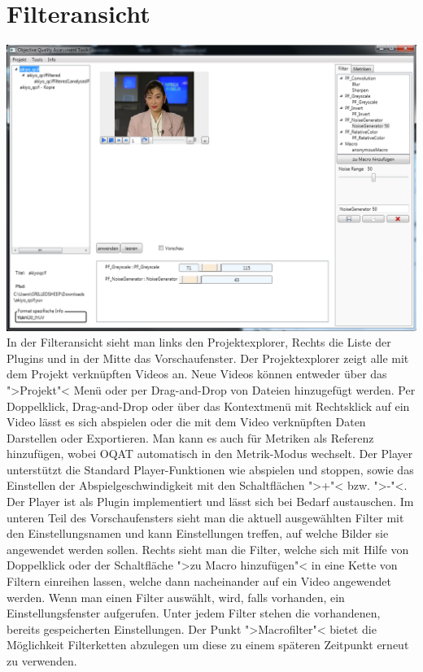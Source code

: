 \chapter{Filteransicht}
\includegraphics[scale=0.55]{bilder/Filter.png}\\[5ex]

In der Filteransicht sieht man links den Projektexplorer, Rechts die Liste der Plugins und in der Mitte das Vorschaufenster.
Der Projektexplorer zeigt alle mit dem Projekt verknüpften Videos an. Neue Videos können entweder über das ">Projekt"< Menü oder per Drag-and-Drop von Dateien hinzugefügt werden.
Per Doppelklick, Drag-and-Drop oder über das Kontextmenü mit Rechtsklick auf ein Video lässt es sich abspielen oder die mit dem Video verknüpften Daten Darstellen oder Exportieren. Man kann es auch für Metriken als Referenz hinzufügen, wobei OQAT automatisch in den Metrik-Modus wechselt.
Der Player unterstützt die Standard Player-Funktionen wie abspielen und stoppen, sowie das Einstellen der Abspielgeschwindigkeit mit den Schaltflächen ">+"< bzw. ">-"<. Der Player ist als Plugin implementiert und lässt sich bei Bedarf austauschen.
Im unteren Teil des Vorschaufensters sieht man die aktuell ausgewählten Filter mit den Einstellungsnamen und kann Einstellungen treffen, auf welche Bilder sie angewendet werden sollen. Rechts sieht man die Filter, welche sich mit Hilfe von Doppelklick oder der Schaltfläche ">zu Macro hinzufügen"< in eine Kette von Filtern einreihen lassen, welche dann nacheinander auf ein Video angewendet werden. Wenn man einen Filter auswählt, wird, falls vorhanden, ein Einstellungsfenster aufgerufen. Unter jedem Filter stehen die vorhandenen, bereits gespeicherten Einstellungen. Der Punkt ">Macrofilter"< bietet die Möglichkeit Filterketten abzulegen um diese zu einem späteren Zeitpunkt erneut zu verwenden.


